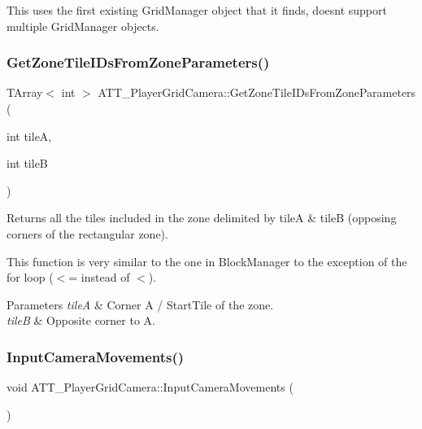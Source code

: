 This uses the first existing Grid\+Manager object that it finds, doesn\textquotesingle{}t support multiple Grid\+Manager objects. \mbox{\label{class_a_t_t___player_grid_camera_afb96fd6854de63d2871cff6402622d9f}} 
\subsubsection{\texorpdfstring{GetZoneTileIDsFromZoneParameters()}{GetZoneTileIDsFromZoneParameters()}}
{\footnotesize\ttfamily T\+Array$<$ int $>$ A\+T\+T\+\_\+\+Player\+Grid\+Camera\+::\+Get\+Zone\+Tile\+I\+Ds\+From\+Zone\+Parameters (\begin{DoxyParamCaption}\item[{int}]{tileA,  }\item[{int}]{tileB }\end{DoxyParamCaption})\hspace{0.3cm}{\ttfamily [protected]}}



Returns all the tiles included in the zone delimited by tileA \& tileB (opposing corners of the rectangular zone). 

This function is very similar to the one in Block\+Manager to the exception of the for loop ($<$= instead of $<$). 
\begin{DoxyParams}{Parameters}
{\em tileA} & Corner A / Start\+Tile of the zone. \\
\hline
{\em tileB} & Opposite corner to A. \\
\hline
\end{DoxyParams}
\mbox{\label{class_a_t_t___player_grid_camera_a8c3523ed3ca9e59d65d7aab20a51a4f3}} 
\subsubsection{\texorpdfstring{InputCameraMovements()}{InputCameraMovements()}}
{\footnotesize\ttfamily void A\+T\+T\+\_\+\+Player\+Grid\+Camera\+::\+Input\+Camera\+Movements (\begin{DoxyParamCaption}{ }\end{DoxyParamCaption})\hspace{0.3cm}{\ttfamily [protected]}}



